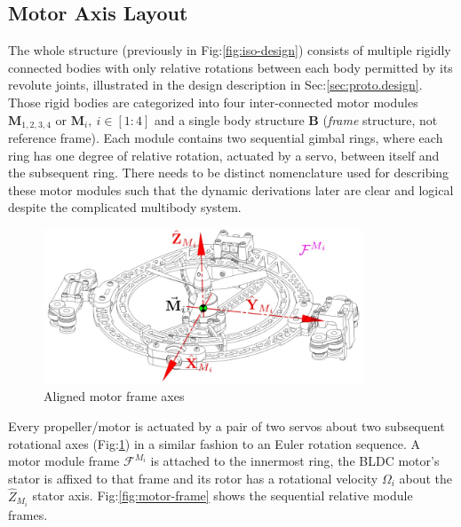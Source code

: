 \subsection{Motor Axis Layout}
\label{subsec:proto.conventions.motoraxis}
The whole structure (previously in Fig:\ref{fig:iso-design}) consists of multiple rigidly connected bodies with only relative rotations between each body permitted by its revolute joints, illustrated in the design description in Sec:\ref{sec:proto.design}. Those rigid bodies are categorized into four inter-connected motor modules $\mathbf{M}_{1,2,3,4}$ or $\mathbf{M}_i,~i\in[1:4]$ and a single body structure $\mathbf{B}$ (\emph{frame} structure, not reference frame). Each module contains two sequential gimbal rings, where each ring has one degree of relative rotation, actuated by a servo, between itself and the subsequent ring. There needs to be distinct nomenclature used for describing these motor modules such that the dynamic derivations later are clear and logical despite the complicated multibody system.
\par
\begin{figure}[htbp]
\vspace{-6pt}
\centering
\includegraphics[width=0.85\textwidth]{figs/motor-axes}
\caption{Aligned motor frame axes}
\label{fig:motor-axes}
\vspace{-6pt}
\end{figure}
Every propeller/motor is actuated by a pair of two servos about two subsequent rotational axes (Fig:\ref{fig:motor-axes}) in a similar fashion to an Euler rotation sequence. A motor module frame $\mathcal{F}^{M_i}$ is attached to the innermost ring, the BLDC motor's stator is affixed to that frame and its rotor has a rotational velocity $\Omega_i$ about the $\hat{Z}_{M_i}$ stator axis. Fig:\ref{fig:motor-frame} shows the sequential relative module frames.
